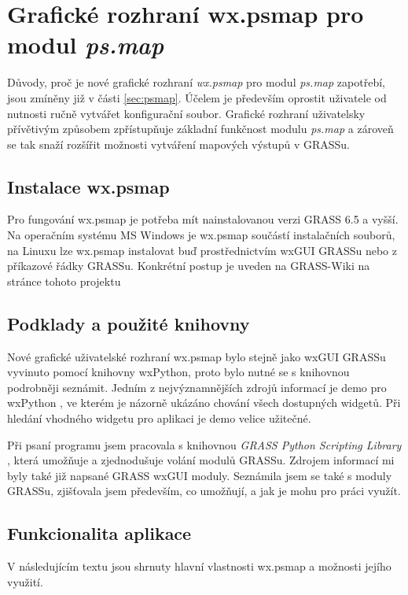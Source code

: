 \documentclass[a4paper,12pt,draft]{article}
\newcommand{\modul}[1]{\emph{#1}}
\begin{document}
\section{Grafické rozhraní  wx.psmap pro modul \modul{ps.map}}
\label{sec:gui}

Důvody, proč je nové grafické rozhraní \emph{wx.psmap} pro modul \modul{ps.map} zapotřebí, jsou zmíněny již v části \ref{sec:psmap}. Účelem je především oprostit uživatele od nutnosti ručně vytvářet konfigurační soubor. Grafické rozhraní uživatelsky přívětivým způsobem zpřístupňuje základní funkčnost modulu \modul{ps.map} a zároveň se tak snaží rozšířit možnosti vytváření mapových výstupů v GRASSu.

\subsection{Instalace wx.psmap}
Pro fungování wx.psmap je potřeba mít nainstalovanou verzi GRASS 6.5 a vyšší. Na operačním systému MS Windows je wx.psmap součástí instalačních souborů, na Linuxu lze wx.psmap instalovat buď prostřednictvím wxGUI GRASSu nebo z příkazové řádky GRASSu. Konkrétní postup je uveden na GRASS-Wiki na stránce tohoto projektu \cite{wiki_wxpsmap} 
\subsection{Podklady a použité knihovny}
Nové grafické uživatelské rozhraní wx.psmap bylo stejně jako wxGUI GRASSu vyvinuto pomocí knihovny wxPython, 
proto bylo nutné se s knihovnou podrobněji seznámit. Jedním z nejvýznamnějších zdrojů informací je demo pro wxPython \cite{demo}, ve kterém je názorně ukázáno chování všech dostupných widgetů. Při hledání vhodného widgetu pro aplikaci je demo velice užitečné. 

Při psaní programu jsem pracovala s knihovnou \emph{GRASS Python Scripting Library} \cite{script}, která umožňuje a zjednodušuje volání modulů GRASSu. Zdrojem informací mi byly také již napsané GRASS wxGUI moduly. Seznámila jsem se také s moduly GRASSu, zjišťovala jsem především, co umožňují, a jak je mohu pro práci využít. 

\subsection{Funkcionalita aplikace}
V následujícím textu jsou shrnuty hlavní vlastnosti wx.psmap a možnosti jejího využití.
\end{document}

